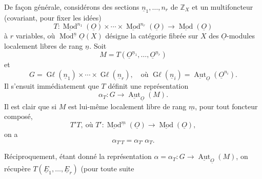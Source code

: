 \documentclass{article}
\newcommand{\Mod}{\operatorname{Mod}}
\newcommand{\Aut}{\operatorname{Aut}}
\begin{document}
De façon générale, considérons des sections \(\underline{n}_1,\ldots,n_r\) de \(\mathbb Z_X\) et un multifoncteur (covariant, pour fixer les idées)
\[
 T:\underline{\Mod}^{n_1}(\underline{O})\times\cdots\times
 \underline{\Mod}^{n_r}(\underline{O})\longrightarrow\underline{\Mod}(\underline{O})
\]
à \(r\) variables, où \(\Mod^{\underline{n}}\underline{O}(X)\) désigne la catégorie fibrée sur \(X\) des \(\underline{O}\)-modules localement libres de rang \(\underline{n}\). Soit
\[
 M=T(\underline{O}^{\underline{n}_1},\ldots,\underline{O}^{\underline{n}_r})
\]
et
\[
 G=\operatorname{G\ell}(\underline{n}_1)\times\cdots\times\operatorname{G\ell}(\underline{n}_r),
 \quad\text{où }\operatorname{G\ell}(\underline{n}_i)=\underline{\Aut}_{\underline{O}}(\underline{O}^{n_i}).
\]
Il s'ensuit immédiatement que \(T\) définit une représentation
\begin{equation}\tag{6.1.2}
 \alpha_T:G\longrightarrow\underline{\Aut}_{\underline{O}}(M).
\end{equation}
Il est clair que si \(M\) est lui-même localement libre de rang \(\underline{m}\), pour tout foncteur composé,
\[
 T'T,\ \text{où } T':\underline{\Mod}^{\underline{m}}(\underline{O})\longrightarrow\underline{\Mod}(\underline{O}),
\]
on a
\begin{equation}\tag{6.1.3}
 \alpha_{T'T}=\alpha_{T'}\,\alpha_T.
\end{equation}

Réciproquement, étant donné la représentation \(\alpha=\alpha_T:G\to\underline{\Aut}_{\underline{O}}(M)\), on récupère \(T(\underline{E}_1,\ldots,\underline{E}_r)\) (pour toute suite
\end{document}
